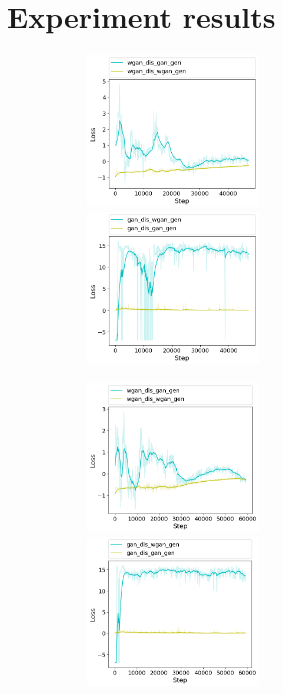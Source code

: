 \appendix 

\section{Experiment results} \label{app:results}

\begin{figure}[h!] 
	\begin{subfigure}[b]{\textwidth}		
		\includegraphics[width=0.5\textwidth]{figures/cross_dis/trial19_wgan_dis_gan_gen}
		\includegraphics[width=0.5\textwidth]{figures/cross_dis/trial19_gan_dis_wgan_gen}
	\end{subfigure}
	\begin{subfigure}[b]{\textwidth}		
		\includegraphics[width=0.5\textwidth]{figures/cross_dis/trial18_wgan_dis_gan_gen}
		\includegraphics[width=0.5\textwidth]{figures/cross_dis/trial18_gan_dis_wgan_gen}

\end{subfigure}
\end{figure}
